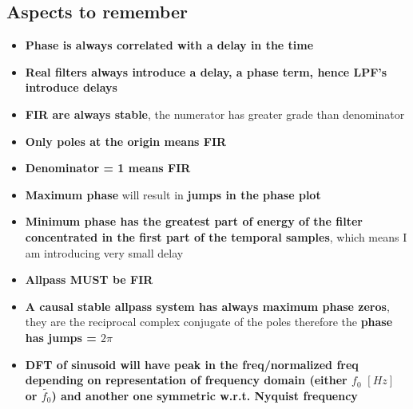 \subsection{Aspects to remember}
\begin{itemize}
    \item \textbf{Phase is always correlated with a delay in the time}
    \item \textbf{Real filters always introduce a delay, a phase term, hence LPF's introduce delays}
    \item \textbf{FIR are always stable}, the numerator has greater grade than denominator
    \item \textbf{Only poles at the origin means FIR}
    \item \textbf{Denominator = 1 means FIR}
    \item \textbf{Maximum phase} will result in \textbf{jumps in the phase plot}
    \item \textbf{Minimum phase has the greatest part of energy of the filter concentrated in the first part of the temporal samples}, which means I am introducing very small delay
    \item \textbf{Allpass MUST be FIR}
    \item \textbf{A causal stable allpass system has always maximum phase
    zeros}, they are the reciprocal complex conjugate of the poles therefore the \textbf{phase has jumps = $2\pi$}
    \item \textbf{DFT of sinusoid will have peak in the freq/normalized freq depending on representation of frequency domain (either $f_0\,\,[Hz]$ or $\tilde{f_0}$) and another one symmetric w.r.t. Nyquist frequency}
\end{itemize}